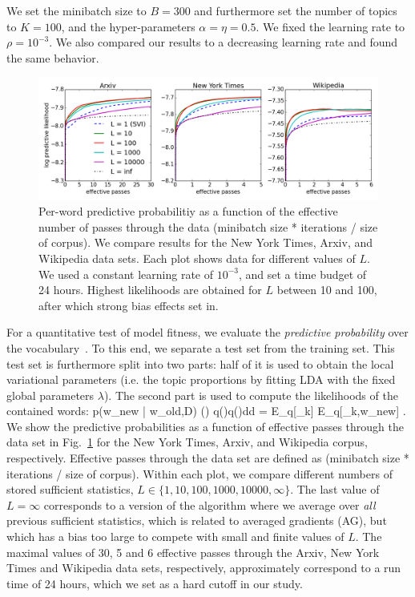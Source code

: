 \documentclass{article} %
\begin{document}
We set the minibatch size to $B=300$ and furthermore set the number of topics to $K=100$, and the hyper-parameters $\alpha=\eta=0.5$. We fixed the learning rate to $\rho = 10^{-3}$.
We also compared our results to a decreasing learning rate and found the same behavior.

\begin{figure}[h]
\centering
\includegraphics[width = \textwidth]{../fig/png/like_all_300_eta_05.png}
\caption{Per-word predictive probabilitiy as a function of the effective number of passes through the data (minibatch size * iterations / size of corpus).
We compare results for the New York Times,  Arxiv, and Wikipedia data sets.
Each plot shows data for different values of $L$. We used a constant learning rate of  $10^{-3}$, and set a time budget of 24 hours. Highest likelihoods are obtained
for $L$ between 10 and 100, after which strong bias effects set in.}
\label{fig:predictive}
\end{figure}

For a quantitative test of model fitness,
we evaluate the \textit{predictive probability} over the vocabulary~\cite{hoffman}.
To this end, we separate a test set from the training set. This test set is furthermore split into two parts: half of it is used to obtain the local variational
parameters (i.e. the topic proportions by fitting LDA with the fixed global parameters $\lambda$).
 The second part is used to compute the likelihoods of the contained words:
\be
p({w}_{\rm new} | {w}_{\rm old},D) \;\approx \;  \int \left(\right) q(\Theta)q(\beta)d\Theta d\beta
\; = \;   {\mathbb E}_q[{\theta_k}] {\mathbb E}_q[{\beta_{k,w_{\rm new}}}] .
\ee
We show the predictive probabilities as a function of effective passes through the data set in Fig.~\ref{fig:predictive}
for the New York Times, Arxiv, and Wikipedia corpus, respectively. Effective passes through the data set are defined as (minibatch size * iterations / size of corpus).
Within each plot,
we compare different  numbers of stored sufficient statistics, $L \in \{1,10,100,1000,10000,\infty\} $. The last value of $L=\infty$ corresponds to a
version of the algorithm where we average over \textit{all} previous sufficient statistics, which is related to averaged gradients (AG), but which has a bias too large
 to compete with small and finite values of $L$.
The maximal values of 30, 5 and 6 effective
passes through the Arxiv, New York Times and Wikipedia data sets, respectively, approximately correspond to a run time of 24 hours, which we set as a hard cutoff in our study.
\end{document}
